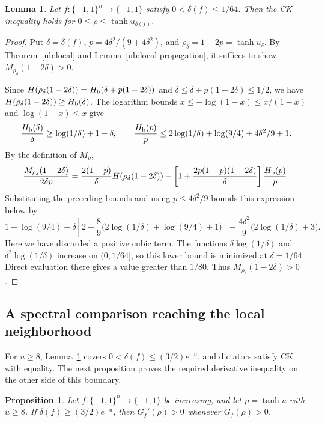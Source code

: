 \documentclass[11pt,letterpaper]{amsart}
\newcommand{\1}{\mathbf 1}
\newtheorem{lemma}[theorem]{Lemma}
\newtheorem{proposition}[theorem]{Proposition}
\numberwithin{equation}{section}
\begin{document}
\begin{lemma}\label{rt:local-junction}
Let $f:\{-1,1\}^n\to\{-1,1\}$ satisfy
$0<\delta(f)\le1/64$.
Then the CK inequality holds for
$0\le\rho\le\tanh u_{\delta(f)}$.
\end{lemma}

\begin{proof}
Put $\delta=\delta(f)$,
$p=4\delta^2/(9+4\delta^2)$, and
$\rho_\delta=1-2p=\tanh u_\delta$.
By Theorem~\ref{ub:local} and
Lemma~\ref{ub:local-propagation}, it suffices to show
$M_{\rho_\delta}(1-2\delta)>0$.

Since
$H(\rho_\delta(1-2\delta))
 =H_{\rm b}(\delta+p(1-2\delta))$
and $\delta\le\delta+p(1-2\delta)\le1/2$, we have
$H(\rho_\delta(1-2\delta))\ge H_{\rm b}(\delta)$.
The logarithm bounds
$x\le-\log(1-x)\le x/(1-x)$ and $\log(1+x)\le x$ give
\[
 \frac{H_{\rm b}(\delta)}{\delta}
 \ge\log(1/\delta)+1-\delta,\qquad
 \frac{H_{\rm b}(p)}p
 \le2\log(1/\delta)+\log(9/4)+4\delta^2/9+1.
\]
By the definition of $M_\rho$,
\[
 \frac{M_{\rho_\delta}(1-2\delta)}{2\delta p}
 =\frac{2(1-p)}{\delta}
       H(\rho_\delta(1-2\delta))-\left[1+\frac{2p(1-p)(1-2\delta)}{\delta}\right]
       \frac{H_{\rm b}(p)}p.
\]
Substituting the preceding bounds and using $p\le4\delta^2/9$
bounds this expression below by
\[
 1-\log(9/4)-\delta\left[2+\frac89
       \bigl(2\log(1/\delta)+\log(9/4)+1\bigr)\right]-\frac{4\delta^2}{9}\bigl(2\log(1/\delta)+3\bigr).
\]
Here we have discarded a positive cubic term.
The functions $\delta\log(1/\delta)$ and
$\delta^2\log(1/\delta)$ increase on $(0,1/64]$, so this lower
bound is minimized at $\delta=1/64$.
Direct evaluation there gives a value greater than $1/80$.
Thus $M_{\rho_\delta}(1-2\delta)>0$.
\end{proof}

\subsection{A spectral comparison reaching the local neighborhood}

For $u\ge8$, Lemma~\ref{rt:local-junction} covers
$0<\delta(f)\le(3/2)e^{-u}$, and dictators satisfy CK with equality.
The next proposition proves the required derivative inequality
on the other side of this boundary.

\begin{proposition}\label{qual:tail-derivative}
Let $f:\{-1,1\}^n\to\{-1,1\}$ be increasing, and let
$\rho=\tanh u$ with $u\ge8$.
If $\delta(f)\ge(3/2)e^{-u}$, then
$G_f'(\rho)>0$ whenever $G_f(\rho)>0$.
\end{proposition}
\end{document}
